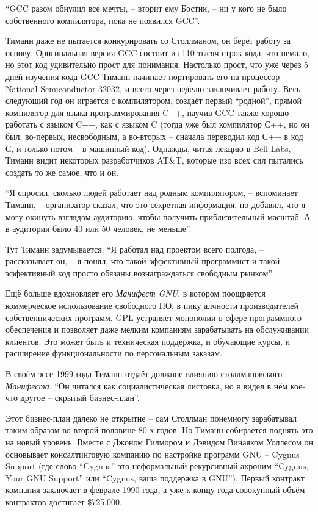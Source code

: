 ``GCC разом обнулил все мечты, -- вторит ему Бостик, -- ни у кого не было собственного компилятора, пока не появился GCC''.

Тиманн даже не пытается конкурировать со Столлманом, он берёт работу за основу. Оригинальная версия GCC состоит из 110 тысяч строк кода, что немало, но этот код удивительно прост для понимания. Настолько прост, что уже через 5 дней изучения кода GCC Тиманн начинает портировать его на процессор National Semiconductor 32032, и всего через неделю заканчивает работу. Весь следующий год он играется с компилятором, создаёт первый ``родной'', прямой компилятор для языка программирования C++, научив GCC также хорошо работать с языком C++, как с языком C (тогда уже был компилятор С++, но он был, во-первых, несвободным, а во-вторых -- сначала переводил код С++ в код С, и только потом -- в машинный код). Однажды, читая лекцию в Bell Labs, Тиманн видит некоторых разработчиков AT\&T, которые изо всех сил пытались создать то же самое, что и он.

``Я спросил, сколько людей работает над родным компилятором, -- вспоминает Тиманн, -- организатор сказал, что это секретная информация, но добавил, что я могу окинуть взглядом аудиторию, чтобы получить приблизительный масштаб. А в аудитории было 40 или 50 человек, не меньше''.

Тут Тиманн задумывается. ``Я работал над проектом всего полгода, -- рассказывает он, -- я понял, что такой эффективный программист и такой эффективный код просто обязаны вознаграждаться свободным рынком''

Ещё больше вдохновляет его \textit{Манифест GNU}, в котором поощряется коммерческое использование свободного ПО, в пику алчности производителей собственнических программ. GPL устраняет монополии в сфере программного обеспечения и позволяет даже мелким компаниям зарабатывать на обслуживании клиентов. Это может быть и техническая поддержка, и обучающие курсы, и расширение функциональности по персональным заказам.

В своём эссе 1999 года Тиманн отдаёт должное влиянию столлмановского \textit{Манифеста}. ``Он читался как социалистическая листовка, но я видел в нём кое-что другое -- скрытый бизнес-план''. 

Этот бизнес-план далеко не открытие -- сам Столлман понемногу зарабатывал таким образом во второй половине 80-х годов. Но Тиманн собирается поднять это на новый уровень. Вместе с Джоном Гилмором и Дэвидом Винаяком Уоллесом он основывает консалтинговую компанию по настройке программ GNU -- Cygnus Support (где слово ``Cygnus'' это неформальный рекурсивный акроним ``Cygnus, Your GNU Support'' или ``Cygnus, ваша поддержка в GNU''). Первый контракт компания заключает в феврале 1990 года, а уже к концу года совокупный объём контрактов достигает \$725,000.


